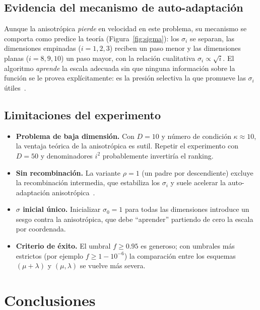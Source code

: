 \documentclass[12pt,letterpaper]{article}
\begin{document}
\subsection{\texorpdfstring{Evidencia del mecanismo de auto-adaptación}{Evidencia del mecanismo de auto-adaptacion}}

Aunque la anisotrópica \emph{pierde} en velocidad en este problema, su mecanismo se comporta como predice la teoría (Figura~\ref{fig:sigma}): los $\sigma_i$ se separan, las dimensiones empinadas ($i=1,2,3$) reciben un paso menor y las dimensiones planas ($i=8,9,10$) un paso mayor, con la relación cualitativa $\sigma_i\propto\sqrt{i}$. El algoritmo \emph{aprende} la escala adecuada sin que ninguna información sobre la función se le provea explícitamente: es la presión selectiva la que promueve las $\sigma_i$ útiles~\cite{beyer2001}.

\subsection{\texorpdfstring{Limitaciones del experimento}{Limitaciones del experimento}}

\begin{itemize}[leftmargin=2.2em, itemsep=3pt]
    \item \textbf{Problema de baja dimensión.} Con $D=10$ y número de condición $\kappa\approx 10$, la ventaja teórica de la anisotrópica es sutil. Repetir el experimento con $D=50$ y denominadores $i^{2}$ probablemente invertiría el ranking.
    \item \textbf{Sin recombinación.} La variante $\rho=1$ (un padre por descendiente) excluye la recombinación intermedia, que estabiliza los $\sigma_i$ y suele acelerar la auto-adaptación anisotrópica~\cite{eiben2015}.
    \item \textbf{$\sigma$ inicial único.} Inicializar $\sigma_0=1$ para todas las dimensiones introduce un sesgo contra la anisotrópica, que debe ``aprender'' partiendo de cero la escala por coordenada.
    \item \textbf{Criterio de éxito.} El umbral $f\geq 0.95$ es generoso; con umbrales más estrictos (por ejemplo $f\geq 1 - 10^{-6}$) la comparación entre los esquemas $(\mu+\lambda)$ y $(\mu,\lambda)$ se vuelve más severa.
\end{itemize}

\newpage
\section{Conclusiones}
\end{document}
